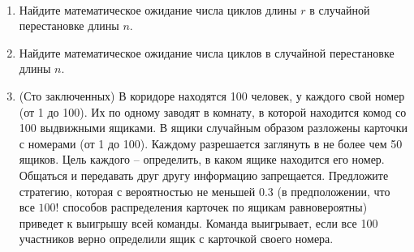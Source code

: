 \begin{problem}
\\
\begin{enumerate}
\item Найдите математическое ожидание числа циклов длины $r$ в 
случайной перестановке длины $n$.

\item Найдите математическое ожидание числа циклов в 
случайной перестановке длины $n$.

\item (Сто заключенных) 
В коридоре находятся 100 человек, у каждого свой номер (от 1 до 100). Их по одному заводят в комнату, в которой 
находится комод со 100 выдвижными ящиками. В ящики случайным образом 
разложены карточки с номерами (от 1 до 100). Каждому разрешается заглянуть в 
не более чем 50 ящиков. Цель каждого -- определить, в каком ящике находится 
его номер. Общаться и передавать друг другу информацию запрещается. 
Предложите стратегию, которая с вероятностью не меньшей $0.3$ (в 
предположении, что все $100!$ способов распределения карточек по ящикам 
равновероятны) приведет к выигрышу всей команды. Команда выигрывает, если 
все 100 участников верно определили ящик с карточкой своего номера.



\end{enumerate}
\end{problem}
